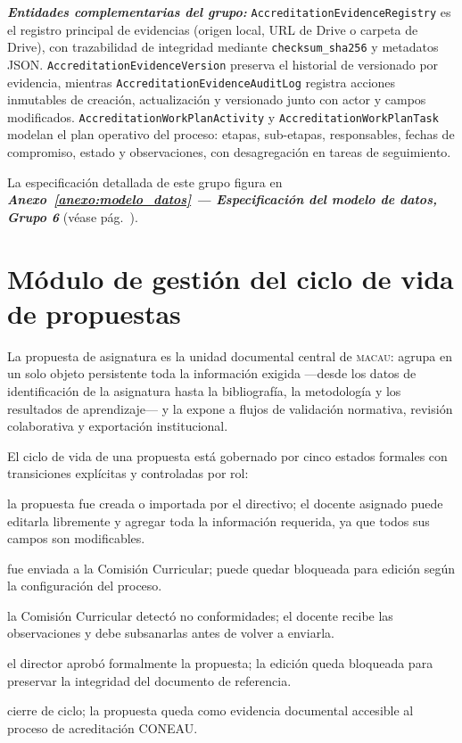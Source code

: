 \textbf{\textit{Entidades complementarias del grupo:}} \texttt{AccreditationEvidenceRegistry}
es el registro principal de evidencias (origen local, URL de Drive o carpeta de
Drive), con trazabilidad de integridad mediante \texttt{checksum\_sha256} y
metadatos JSON. \texttt{AccreditationEvidenceVersion} preserva el historial de
versionado por evidencia, mientras \texttt{AccreditationEvidenceAuditLog}
registra acciones inmutables de creación, actualización y versionado junto con
actor y campos modificados. \texttt{AccreditationWorkPlanActivity} y
\texttt{AccreditationWorkPlanTask} modelan el plan operativo del proceso:
etapas, sub-etapas, responsables, fechas de compromiso, estado y observaciones,
con desagregación en tareas de seguimiento.

La especificación detallada de este grupo figura en \textbf{\textit{Anexo~\ref{anexo:modelo_datos} — Especificación del modelo de datos, Grupo 6}} (véase pág.~\pageref{anexo:grupo6_modelo_datos}).

\section{Módulo de gestión del ciclo de vida de propuestas}
\label{sec:propuestas}

La propuesta de asignatura es la unidad documental central de \textsc{macau}:
agrupa en un solo objeto persistente toda la información exigida —desde los datos de identificación de la asignatura hasta la
bibliografía, la metodología y los resultados de aprendizaje— y la expone a
flujos de validación normativa, revisión colaborativa y exportación
institucional.

El ciclo de vida de una propuesta está gobernado por cinco estados formales
con transiciones explícitas y controladas por rol:
\begin{description}[noitemsep, topsep=3pt]
    \item[\textit{Borrador}:] la propuesta fue creada o importada por el directivo; el docente asignado puede editarla libremente y agregar toda la información requerida, ya que todos sus campos son modificables.
    \item[\textit{En revisión}:] fue enviada a la Comisión Curricular; puede
          quedar bloqueada para edición según la configuración del proceso.
    \item[\textit{Observada}:] la Comisión Curricular detectó no conformidades;
          el docente recibe las observaciones y debe subsanarlas antes de
          volver a enviarla.
    \item[\textit{Aprobada}:] el director aprobó formalmente la propuesta;
          la edición queda bloqueada para preservar la integridad del documento
          de referencia.
    \item[\textit{Archivada}:] cierre de ciclo; la propuesta queda como
          evidencia documental accesible al proceso de acreditación CONEAU.
\end{description}

